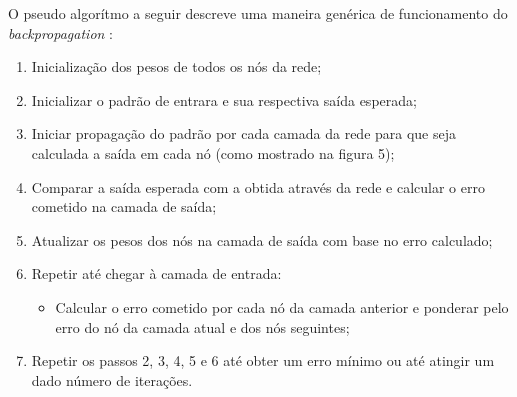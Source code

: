 O pseudo algorítmo a seguir descreve uma maneira genérica de funcionamento do \textit{backpropagation} :

\begin{enumerate}[noitemsep]
    \item Inicialização dos pesos de todos os nós da rede;
    \item Inicializar o padrão de entrara e sua respectiva saída esperada;
    \item Iniciar propagação do padrão por cada camada da rede para que seja calculada a saída em cada nó (como mostrado na figura 5);
    \item Comparar a saída esperada com a obtida através da rede e calcular o erro cometido na camada de saída;
    \item Atualizar os pesos dos nós na camada de saída com base no erro calculado;
    \item Repetir até chegar à camada de entrada:
        \begin{itemize}[noitemsep]
            \item Calcular o erro cometido por cada nó da camada anterior e ponderar pelo erro do nó da camada atual e dos nós seguintes;
        \end{itemize}
    \item Repetir os passos 2, 3, 4, 5 e 6 até obter um erro mínimo ou até atingir um dado número de iterações.
\end{enumerate}


